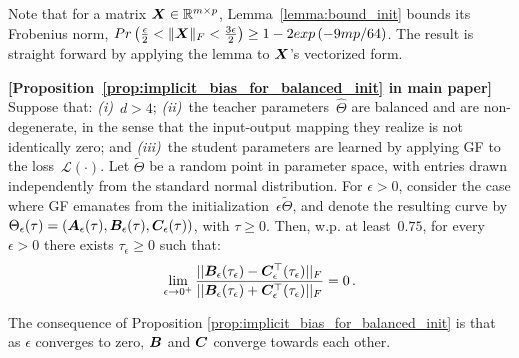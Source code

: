 Note that for a matrix ${\bm{X}}\in\mathbb{R}^{m\times p}$, Lemma~\ref{lemma:bound_init} bounds its Frobenius norm, $Pr\left(\frac{\epsilon}{2}< \|{\bm{X}}\|_F<\frac{3\epsilon}{2} \right)\ge 1-2exp\left(-9mp/64\right)$. The result is straight forward by applying the lemma to ${\bm{X}}$'s vectorized form.


\begin{proposition}\textbf{[Proposition~\ref{prop:implicit_bias_for_balanced_init} in main paper]} 
Suppose that:
\emph{(i)}~$d > 4$;
\emph{(ii)}~the teacher parameters~$\hat{\Theta}$ are balanced and are non-degenerate, in the sense that the input-output mapping they realize is not identically zero;
and 
\emph{(iii)}~the student parameters are learned by applying GF to the loss~$\mathcal{L} ( \cdot )$.
Let $\tilde{\Theta}$ be a random point in parameter space, with entries drawn independently from the standard normal distribution.
For $\epsilon > 0$, consider the case where GF emanates from the initialization~$\epsilon \tilde{\Theta}$, and denote the resulting curve by $\Theta_\epsilon ( \tau ) = ( {\bm{A}}_\epsilon ( \tau ) , {\bm{B}}_\epsilon ( \tau ) , {\bm{C}}_\epsilon ( \tau ) )$, with $\tau \geq 0$.
Then, w.p. at least~$0.75$, for every $\epsilon > 0$ there exists $\tau_\epsilon \geq 0$ such that:
\begin{equation}
    \lim_{\epsilon\rightarrow 0^+}\frac{||{\bm{B}}_{\epsilon}(\tau_\epsilon) - {\bm{C}}_{\epsilon}^\top(\tau_\epsilon) ||_F}{||{\bm{B}}_{\epsilon}(\tau_\epsilon) + {\bm{C}}_{\epsilon}^\top(\tau_\epsilon) ||_F}=0
    \text{\,.}
\end{equation}

\end{proposition}

The consequence of Proposition \ref{prop:implicit_bias_for_balanced_init} is that as $\epsilon$ converges to zero, ${\bm{B}}$ and ${\bm{C}}$ converge towards each other. 

